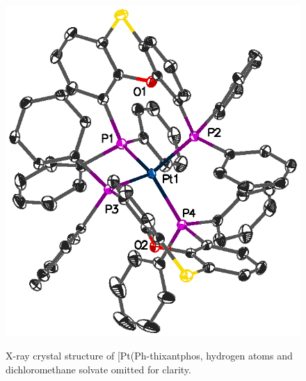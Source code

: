 \begin{figure}[htbp]
\begin{center}
\vspace{0.5cm}
\includegraphics[scale=0.9]{../Figures/CrystalPtSPh2.eps}
\caption[X-ray crystal structure of [Pt(Ph-thixantphos\ce{)2]}]{X-ray crystal structure of [Pt(Ph-thixantphos\ce{)2]}, hydrogen atoms and dichloromethane solvate omitted for clarity.}
\vspace{0.2cm}
\label{crystalbisthixantphosplatinum}
\end{center}
\end{figure}
\vspace{0.2cm}

